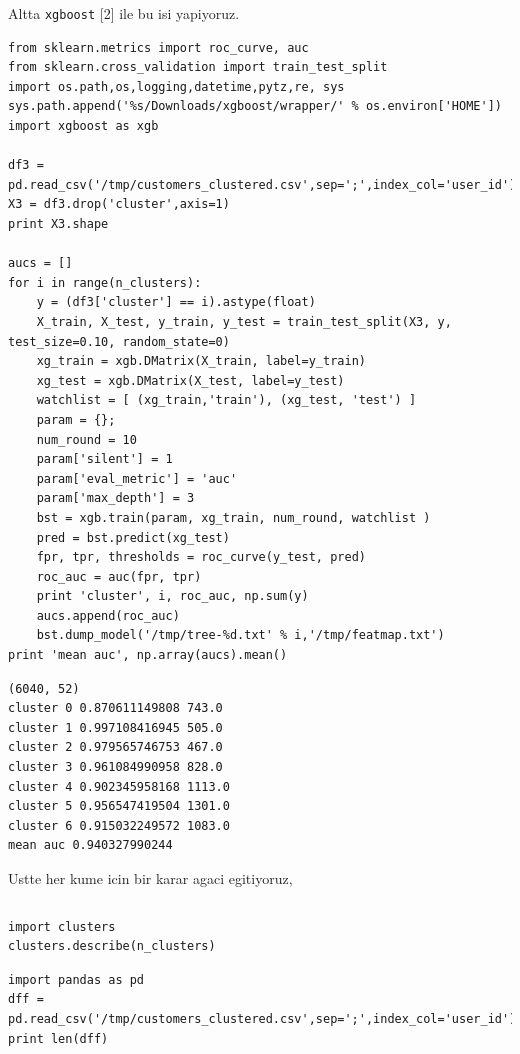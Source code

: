 \documentclass[12pt,fleqn]{article}\usepackage{../common}
\begin{document}
Altta \verb!xgboost! [2] ile bu isi yapiyoruz. 

\begin{verbatim}
from sklearn.metrics import roc_curve, auc
from sklearn.cross_validation import train_test_split
import os.path,os,logging,datetime,pytz,re, sys
sys.path.append('%s/Downloads/xgboost/wrapper/' % os.environ['HOME'])
import xgboost as xgb

df3 = pd.read_csv('/tmp/customers_clustered.csv',sep=';',index_col='user_id')
X3 = df3.drop('cluster',axis=1)
print X3.shape

aucs = []
for i in range(n_clusters):
    y = (df3['cluster'] == i).astype(float)    
    X_train, X_test, y_train, y_test = train_test_split(X3, y, test_size=0.10, random_state=0)
    xg_train = xgb.DMatrix(X_train, label=y_train)
    xg_test = xgb.DMatrix(X_test, label=y_test)    
    watchlist = [ (xg_train,'train'), (xg_test, 'test') ]    
    param = {}; 
    num_round = 10
    param['silent'] = 1
    param['eval_metric'] = 'auc'
    param['max_depth'] = 3
    bst = xgb.train(param, xg_train, num_round, watchlist )
    pred = bst.predict(xg_test)
    fpr, tpr, thresholds = roc_curve(y_test, pred)
    roc_auc = auc(fpr, tpr)
    print 'cluster', i, roc_auc, np.sum(y)
    aucs.append(roc_auc)
    bst.dump_model('/tmp/tree-%d.txt' % i,'/tmp/featmap.txt')
print 'mean auc', np.array(aucs).mean()
\end{verbatim}

\begin{verbatim}
(6040, 52)
cluster 0 0.870611149808 743.0
cluster 1 0.997108416945 505.0
cluster 2 0.979565746753 467.0
cluster 3 0.961084990958 828.0
cluster 4 0.902345958168 1113.0
cluster 5 0.956547419504 1301.0
cluster 6 0.915032249572 1083.0
mean auc 0.940327990244
\end{verbatim}

Ustte her kume icin bir karar agaci egitiyoruz, 

\inputminted[fontsize=\footnotesize]{python}{clusters.py}

\begin{verbatim}
import clusters
clusters.describe(n_clusters)
\end{verbatim}

\begin{verbatim}
import pandas as pd
dff = pd.read_csv('/tmp/customers_clustered.csv',sep=';',index_col='user_id')
print len(dff)
\end{verbatim}
\end{document}
